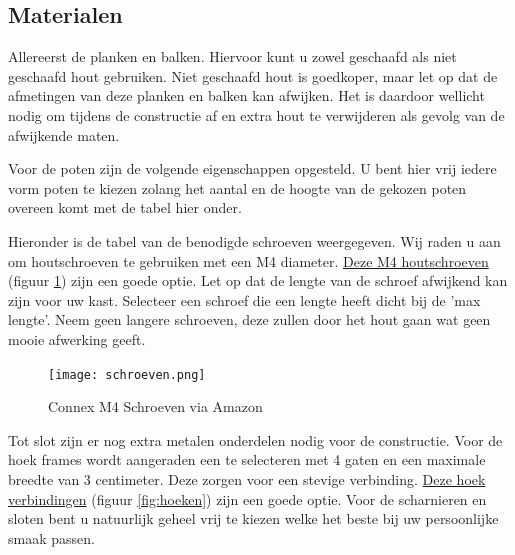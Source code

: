 \documentclass{article}
\begin{document}
\subsection{Materialen}

Allereerst de planken en balken. Hiervoor kunt u zowel geschaafd als niet geschaafd hout gebruiken. Niet geschaafd hout is goedkoper, maar let op dat de afmetingen van deze planken en balken kan afwijken.  Het is daardoor wellicht nodig om tijdens de constructie af en extra hout te verwijderen als gevolg van de afwijkende maten.



Voor de poten zijn de volgende eigenschappen opgesteld. U bent hier vrij iedere vorm poten te kiezen zolang het aantal en de hoogte van de gekozen poten overeen komt met de tabel hier onder.



Hieronder is de tabel van de benodigde schroeven weergegeven. Wij raden u aan om houtschroeven te gebruiken met een M4 diameter. \href{https://www.amazon.nl/gp/product/B00B214ZLQ/ref=ppx_yo_dt_b_asin_title_o07_s00?ie=UTF8&psc=1}{Deze M4 houtschroeven} (figuur \ref{fig:schroeven}) zijn een goede optie. Let op dat de lengte van de schroef afwijkend kan zijn voor uw kast. Selecteer een schroef die een lengte heeft dicht bij de 'max lengte'. Neem geen langere schroeven, deze zullen door het hout gaan wat geen mooie afwerking geeft.



\begin{figure}[h!]
    \centering
    \texttt{[image: schroeven.png]}
    \caption{Connex M4 Schroeven via Amazon}
    \label{fig:schroeven}
\end{figure}

\clearpage
\newpage

Tot slot zijn er nog extra metalen onderdelen nodig voor de constructie. Voor de hoek frames wordt aangeraden een te selecteren met 4 gaten en een maximale breedte van 3 centimeter. Deze zorgen voor een stevige verbinding. \href{https://www.amazon.nl/Connex-HVG2400-voordeelpak-hoekverbinder-verzinkt/dp/B00J7L2ET8/ref=sr_1_9?__mk_nl_NL=%C3%85M%C3%85%C5%BD%C3%95%C3%91&crid=22ED59WFFPB0Z&keywords=hoekverbinder&qid=1660427081&sprefix=hoekverbinder%2Caps%2C85&sr=8-9}{Deze hoek verbindingen} (figuur \ref{fig:hoeken}) zijn een goede optie. Voor de scharnieren en sloten bent u natuurlijk geheel vrij te kiezen welke het beste bij uw persoonlijke smaak passen.
\end{document}
